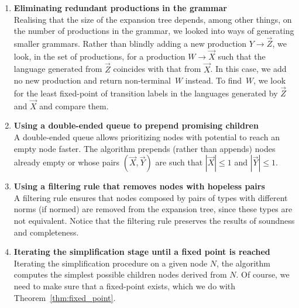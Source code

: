\begin{enumerate}
	\item {\bf Eliminating redundant productions in the grammar} \\
	Realising that the size of 
	the expansion tree depends, among other
	things, on the number of productions in the grammar, we looked into
	ways of generating smaller grammars. Rather than blindly adding a new production
$Y \rightarrow \vec Z$, we look, in the set of productions, for a
production $W \rightarrow \vec X$ such that the language generated
from $\vec Z$ coincides with that from $\vec X$. In this
case, we add no new production and return non-terminal~$W$ instead. To
find~$W$, we look for the least fixed-point of transition labels in the
languages generated by $\vec Z$ and $\vec X$ and compare them.
	\item {\bf Using a double-ended queue to prepend promising children} \\
A double-ended queue allows prioritizing nodes with potential to
reach an empty node faster.
The algorithm prepends (rather than
appends) nodes already empty or whose pairs $(\vec X, \vec Y)$
are such that $|\vec X|\leq 1$ and $|\vec Y| \leq 1$. 
	\item {\bf Using a filtering rule that removes nodes with hopeless pairs}\\
	A filtering rule
ensures that nodes composed by pairs of types with different norms (if normed)
are removed from the expansion tree, since these types are not equivalent. 
Notice that the filtering rule preserves the results of soundness and 
completeness.
	\item {\bf Iterating the simplification stage until a fixed point is reached}\\
	Iterating the simplification procedure on a given node $N$, the
algorithm computes the simplest possible children nodes derived from
$N$. Of course, we need to make sure that a fixed-point exists, which
we do with Theorem~\ref{thm:fixed_point}.
\end{enumerate}

